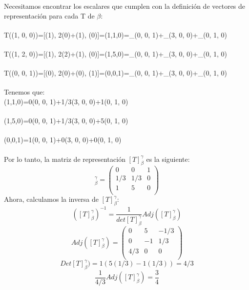\begin{enumerate}
        Necesitamos encontrar los escalares que cumplen con la definición de vectores de representación para cada T de $\beta$:\\
\\
T((1, 0, 0))=[(1), 2(0)+(1), (0)]=(1,1,0)=\_(0, 0, 1)+\_(3, 0, 0)+\_(0, 1, 0)\\
\\
T((1, 2, 0))=[(1), 2(2)+(1), (0)]=(1,5,0)=\_(0, 0, 1)+\_(3, 0, 0)+\_(0, 1, 0)\\
\\
T((0, 0, 1))=[(0), 2(0)+(0), (1)]=(0,0,1)=\_(0, 0, 1)+\_(3, 0, 0)+\_(0, 1, 0)\\
\\
Tenemos que:\\
(1,1,0)=0(0, 0, 1)+1/3(3, 0, 0)+1(0, 1, 0)\\
\\
(1,5,0)=0(0, 0, 1)+1/3(3, 0, 0)+5(0, 1, 0)\\
\\
(0,0,1)=1(0, 0, 1)+0(3, 0, 0)+0(0, 1, 0)\\
\\
Por lo tanto, la matriz de representación $[T]^{\gamma}_{\beta}$ es la siguiente:
\begin{equation*}
[T]^{\gamma}_{\beta}= 
\begin{pmatrix}
    0 & 0 & 1\\
    1/3 & 1/3 & 0\\
    1 & 5 & 0\\
\end{pmatrix}
\end{equation*}
   Ahora, calculamos la inversa de $[T]^{\gamma}_{\beta}$:
   \begin{equation*}
       ([T]^{\gamma}_{\beta})^{-1}=\frac{1}{det[T]^{\gamma}_{\beta}}Adj([T]^{\gamma}_{\beta})
   \end{equation*}
   \begin{equation*} 
   Adj([T]^{\gamma}_{\beta})=
      \begin{pmatrix}
  0	& 5	&-1/3\\
  0 &	-1	& 1/3\\
4/3	& 0	 &  0\\
      \end{pmatrix} 
   \end{equation*}
   \begin{equation*}
     Det[T]^{\gamma}_{\beta})=1(5(1/3)-1(1/3))=4/3
   \end{equation*}
   \begin{equation*}\frac{1}{4/3}Adj([T]^{\gamma}_{\beta})= \frac{3}{4}

\end{equation*}
\end{enumerate}
